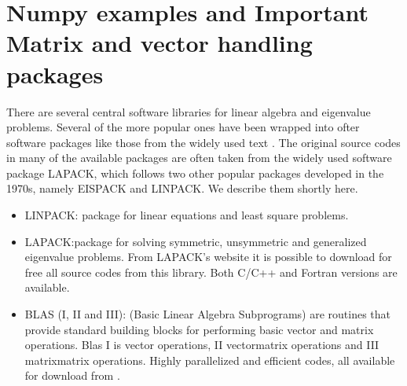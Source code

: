 \documentclass[letterpaper,10pt,english]{sphinxmanual}
\begin{document}
\section{Numpy examples and Important Matrix and vector handling packages}
\label{\detokenize{chapter1:numpy-examples-and-important-matrix-and-vector-handling-packages}}
There are several central software libraries for linear algebra and eigenvalue problems. Several of the more
popular ones have been wrapped into ofter software packages like those from the widely used text . The original source codes in many of the available packages are often taken from the widely used
software package LAPACK, which follows two other popular packages
developed in the 1970s, namely EISPACK and LINPACK.  We describe them shortly here.
\begin{itemize}
\item {} 
LINPACK: package for linear equations and least square problems.

\item {} 
LAPACK:package for solving symmetric, unsymmetric and generalized eigenvalue problems. From LAPACK’s website  it is possible to download for free all source codes from this library. Both C/C++ and Fortran versions are available.

\item {} 
BLAS (I, II and III): (Basic Linear Algebra Subprograms) are routines that provide standard building blocks for performing basic vector and matrix operations. Blas I is vector operations, II vector\sphinxhyphen{}matrix operations and III matrix\sphinxhyphen{}matrix operations. Highly parallelized and efficient codes, all available for download from .

\end{itemize}
\end{document}
